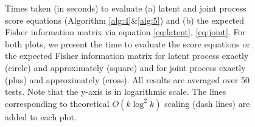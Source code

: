 \documentclass[article,ij4uq]{ij4uq}              %
\newcommand{\cm}[1]{{\color{red}Mihai:{#1}}}
\newcommand{\YC}[1]{\textcolor{blue}{[Yian:#1]}}
\begin{document}
\begin{figure}[!t]
{\begin{minipage}[t]{0.30\textwidth}
\end{minipage}}
  \caption{Times taken (in seconds) to evaluate (a) latent and joint process score equations (Algorithm \ref{alg:4}\&\ref{alg:5}) and (b) the expected Fisher information matrix via equation \eqref{eq:latent}, \eqref{eq:joint}. For both plots, we present the time to evaluate the score equations or the expected Fisher information matrix for latent process exactly (circle) and approximately (square) and for joint process exactly (plus) and approximately (cross). All results are averaged over 50 tests. Note that the y-axis is in logarithmic scale. The lines corresponding to theoretical $O(k\log^{2}{k})$ scaling (dash lines) are added to each plot.} 
  	\label{fig:3_2} 
\end{figure}
 				
\end{document}
